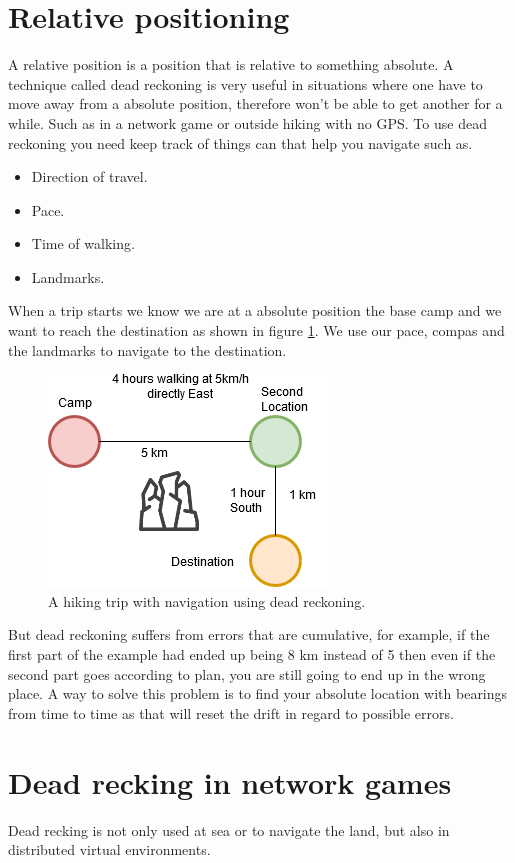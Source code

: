 \section{Relative positioning}
A relative position is a position that is relative to something absolute. A technique called dead reckoning is very useful in situations where one have to move away from a absolute position, therefore won't be able to get another for a while. Such as in a network game or outside hiking with no GPS. To use dead reckoning you need keep track of things can that help you navigate such as. 
\begin{itemize}
\item Direction of travel.
\item Pace.
\item Time of walking.
\item Landmarks.
\end{itemize}
When a trip starts we know we are at a absolute position the base camp and we want to reach the destination as shown in figure \ref{fig:deadrecdrawing}. We use our pace, compas and the landmarks to navigate to the destination.
\begin{figure}[H]
	\centering
	\includegraphics[width=0.4\linewidth]{positioning/positioning/deadRecDrawing}
	\caption{A hiking trip with navigation using dead reckoning.}
	\label{fig:deadrecdrawing}
\end{figure}
But dead reckoning suffers from errors that are cumulative, for example, if the first part of the example had ended up being 8 km instead of 5 then even if the second part goes according to plan, you are still going to end up in the wrong place. A way to solve this problem is to find your absolute location with bearings from time to time as that will reset the drift in regard to possible errors.
\section{Dead recking in network games}
Dead recking is not only used at sea or to navigate the land, but also in distributed virtual environments. 




